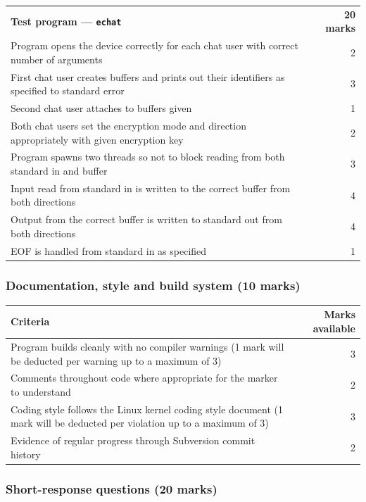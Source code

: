 \documentclass[12pt,a4paper]{article}
\begin{document}
\begin{longtable}{p{13cm} r}
    & \\
    \midrule
    \textbf{Test program --- \texttt{echat}} & \textbf{20 marks} \\
    Program opens the device correctly for each chat user with correct number of arguments & 2 \\
    First chat user creates buffers and prints out their identifiers as specified to standard error & 3 \\
    Second chat user attaches to buffers given & 1 \\
    Both chat users set the encryption mode and direction appropriately with given encryption key & 2 \\
    Program spawns two threads so not to block reading from both standard in and buffer & 3 \\
    Input read from standard in is written to the correct buffer from both directions & 4 \\
    Output from the correct buffer is written to standard out from both directions & 4 \\
    EOF is handled from standard in as specified & 1 \\

    \bottomrule
\end{longtable}

\subsubsection*{Documentation, style and build system (10 marks)}

\begin{longtable}{p{13cm} r}
    \toprule
    \textbf{Criteria} & \textbf{Marks available} \\

    \midrule
    Program builds cleanly with no compiler warnings (1 mark will be
        deducted per warning up to a maximum of 3) & 3 \\
    Comments throughout code where appropriate for the marker to understand & 2 \\
    Coding style follows the Linux kernel coding style document (1 mark will be
        deducted per violation up to a maximum of 3) & 3 \\
    Evidence of regular progress through Subversion commit history & 2 \\

    \bottomrule
\end{longtable}

\subsubsection*{Short-response questions (20 marks)}
\end{document}

